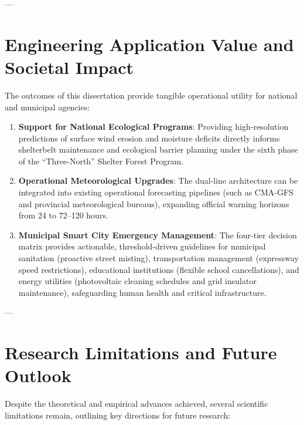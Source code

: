 ---

\section{Engineering Application Value and Societal Impact}
\label{sec:engineering_value}

The outcomes of this dissertation provide tangible operational utility for national and municipal agencies:
\begin{enumerate}
    \item \textbf{Support for National Ecological Programs}: Providing high-resolution predictions of surface wind erosion and moisture deficits directly informs shelterbelt maintenance and ecological barrier planning under the sixth phase of the ``Three-North'' Shelter Forest Program.
    \item \textbf{Operational Meteorological Upgrades}: The dual-line architecture can be integrated into existing operational forecasting pipelines (such as CMA-GFS and provincial meteorological bureaus), expanding official warning horizons from 24 to 72--120 hours.
    \item \textbf{Municipal Smart City Emergency Management}: The four-tier decision matrix provides actionable, threshold-driven guidelines for municipal sanitation (proactive street misting), transportation management (expressway speed restrictions), educational institutions (flexible school cancellations), and energy utilities (photovoltaic cleaning schedules and grid insulator maintenance), safeguarding human health and critical infrastructure.
\end{enumerate}

---

\section{Research Limitations and Future Outlook}
\label{sec:limitations_outlook}

Despite the theoretical and empirical advances achieved, several scientific limitations remain, outlining key directions for future research:

